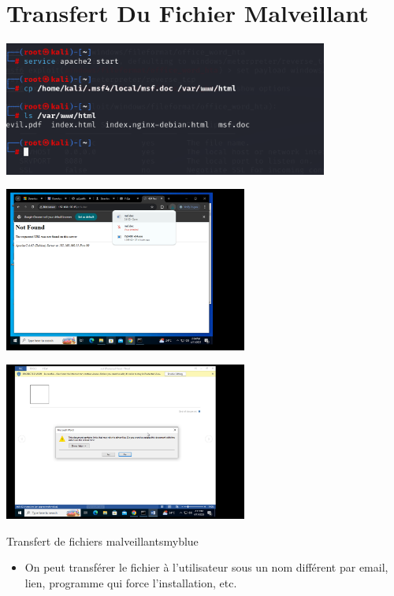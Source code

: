 \section{Transfert Du Fichier Malveillant}

\begin{center}
    \includegraphics[width=0.8\textwidth]{Question/SC/9_kali.PNG}
\end{center}

\vspace{0.15cm}

\begin{center}
    \includegraphics[width=0.6\textwidth]{Question/SC/9_win.PNG}
\end{center}

\vspace{0.15cm}

\begin{center}
    \includegraphics[width=0.6\textwidth]{Question/SC/9_3.PNG}
\end{center}


\vspace{0.35cm}

\begin{prettyBox}{Transfert de fichiers malveillants}{myblue}
\begin{itemize}
    \item On peut transférer le fichier à l'utilisateur sous un nom différent par email, lien, programme qui force l'installation, etc.
\end{itemize}
\end{prettyBox}
